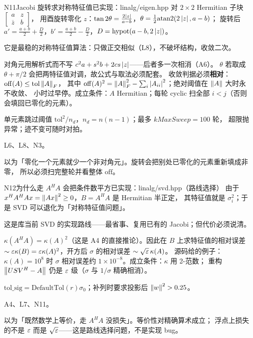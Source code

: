 \begin{know}{N11}{Jacobi 旋转求对称特征值}{已实现：linalg/eigen.hpp}
 对 $2\times2$ Hermitian 子块 $\begin{bmatrix}a&z\\\overline{z}&b\end{bmatrix}$，
用酉旋转零化 $z$：$\tan2\theta=\frac{2\left\lvert z\right\rvert}{a-b}$，$\theta=\frac12\mathrm{atan2}(2\left\lvert z\right\rvert,a-b)$；
旋转后 $a'=\frac{a+b}{2}+\frac{D}{2}$，$b'=\frac{a+b}{2}-\frac{D}{2}$，$D=\mathrm{hypot}(a-b,2\left\lvert z\right\rvert)$。

 它是最稳的对称特征值算法：只做正交相似（L8），不破坏结构，收敛二次。

 对角元用解析式而不写 $c^{2}a+s^{2}b+2cs\left\lvert z\right\rvert$——后者多一次相消（A6）。
$\theta$ 若取成 $\theta+\pi/2$ 会把两特征值对调，故公式与取法必须配套。
收敛判据必须\textbf{相对}：$\mathrm{off}(A)\le\mathrm{tol}\left\lVert A\right\rVert_{F}$，
其中 $\mathrm{off}(A)^{2}=\left\lVert A\right\rVert_{F}^{2}-\sum_i\left\lvert A_{ii}\right\rvert^{2}$；绝对阈值在 $\left\lVert A\right\rVert$ 大时永不收敛、
小时过早停。成立条件：$A$ Hermitian；每轮 cyclic 扫全部 $i<j$（否则会填回已零化的元素）。

 单元素跳过阈值 $\mathrm{tol}^{2}/n_d$，$n_d=n(n-1)$；最多 $kMaxSweep=100$ 轮，
超限抛异常；迹不变可随时对拍。

 L6、L8、N3。

 以为「零化一个元素就少一个非对角元」。旋转会把别处已零化的元素重新填成非零，
所以必须扫完整轮并看整体 $\mathrm{off}$。
\end{know}

\begin{know}{N12}{为什么走 $A^{H}A$ 会把条件数平方}{已实现：linalg/svd.hpp（路线选择）}
 由于 $x^{H}A^{H}Ax=\left\lVert Ax\right\rVert^{2}\ge0$，$B=A^{H}A$ 是 Hermitian 半正定，
其特征值就是 $\sigma_i^{2}$；于是 SVD 可以退化为「对称特征值问题」。

 这是库当前 SVD 的实现路线——最省事、复用已有的 Jacobi；但代价必须说清。

 $\kappa(A^{H}A)=\kappa(A)^{2}$（这是 A4 的直接推论）。因此在 $B$ 上求特征值的相对误差
$\sim\varepsilon\kappa(B)=\varepsilon\kappa(A)^{2}$，开方后 $\sigma$ 的相对误差 $\sim\sqrt{\varepsilon}\,\kappa(A)$。
源码给的例子：$\kappa(A)=10^{8}$ 时 $\sigma$ 相对误差约 $1\times10^{-8}$。成立条件：$\kappa$ 用 2-范数；
重构 $\left\lVert USV^{H}-A\right\rVert$ 仍是 $\varepsilon$ 级（$\sigma$ 与 $1/\sigma$ 精确相消）。

 $\mathrm{tol\_sig}=\mathrm{DefaultTol}(r)\sigma_0$；补列时要求投影后 $\left\lVert w\right\rVert^{2}>0.25$。

 A4、L7、N11。

 以为「既然数学上等价，走 $A^{H}A$ 没损失」。等价性对精确算术成立；
浮点上损失的不是 $\varepsilon$ 而是 $\sqrt{\varepsilon}$——这是路线选择问题，不是实现 bug。
\end{know}


